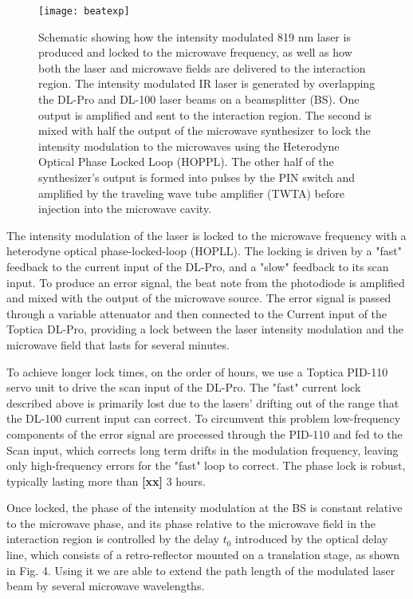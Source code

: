 \documentclass[aps,pra,preprint,groupedaddress]{revtex4-1}
\begin{document}
\begin{figure}
	\texttt{[image: beatexp]}
	\caption{Schematic showing how the intensity modulated 819 nm laser is produced and locked to the microwave frequency, as well as how both the laser and microwave fields are delivered to the interaction region. The intensity modulated IR laser is generated by overlapping the DL-Pro and DL-100 laser beams on a beamsplitter (BS). One output is amplified and sent to the interaction region. The second is mixed with half the output of the microwave synthesizer to lock the intensity modulation to the microwaves using the Heterodyne Optical Phase Locked Loop (HOPPL). The other half of the synthesizer's output is formed into pulses by the PIN switch and amplified by the traveling wave tube amplifier (TWTA) before injection into the microwave cavity. }
	\label{fig:pll}
\end{figure}


The intensity modulation of the laser is locked to the microwave frequency with a heterodyne optical phase-locked-loop (HOPLL). The locking is driven by a "fast" feedback to the current input of the DL-Pro, and a "slow" feedback to its scan input. To produce an error signal, the beat note from the photodiode is amplified and mixed with the output of the microwave source. The error signal is passed through a variable attenuator and then connected to the Current input of the Toptica DL-Pro, providing a lock between the laser intensity modulation and the microwave field that lasts for several minutes.


To achieve longer lock times, on the order of hours, we use a Toptica PID-110 servo unit to drive the scan input of the DL-Pro. The "fast" current lock described above is primarily lost due to the lasers' drifting out of the range that the DL-100 current input can correct. To circumvent this problem low-frequency components of the error signal are processed through the PID-110 and fed to the Scan input, which corrects long term drifts in the modulation frequency, leaving only high-frequency errors for the "fast" loop to correct. The phase lock is robust, typically lasting more than \textbf{[xx]} 3 hours.


Once locked, the phase of the intensity modulation at the BS is constant relative to the microwave phase, and its phase relative to the microwave field in the interaction region is controlled by the delay $t_0$ introduced by the optical delay line, which consists of a retro-reflector mounted on a translation stage, as shown in Fig. 4. Using it we are able to extend the path length of the modulated laser beam by several microwave wavelengths.
\end{document}
